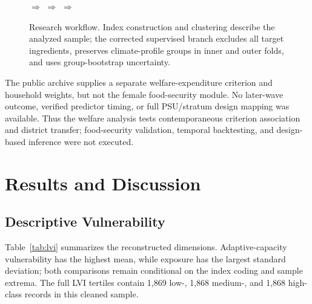 \documentclass[conference,a4paper]{IEEEtran}
\begin{document}
\begin{figure}[t]
\centering
\setlength{\fboxsep}{4pt}
\footnotesize
{}
\hfill$\Longrightarrow$\hfill
{}
\hfill$\Longrightarrow$\hfill
{}
\hfill$\Longrightarrow$\hfill
{}
\caption{Research workflow. Index construction and clustering describe the analyzed sample; the corrected supervised branch excludes all target ingredients, preserves climate-profile groups in inner and outer folds, and uses group-bootstrap uncertainty.}
\label{fig:workflow}
\end{figure}

The public archive supplies a separate welfare-expenditure criterion and household weights, but not the female food-security module. No later-wave outcome, verified predictor timing, or full PSU/stratum design mapping was available. Thus the welfare analysis tests contemporaneous criterion association and district transfer; food-security validation, temporal backtesting, and design-based inference were not executed.

\section{Results and Discussion}
\subsection{Descriptive Vulnerability}
Table~\ref{tab:lvi} summarizes the reconstructed dimensions. Adaptive-capacity vulnerability has the highest mean, while exposure has the largest standard deviation; both comparisons remain conditional on the index coding and sample extrema. The full LVI tertiles contain 1,869 low-, 1,868 medium-, and 1,868 high-class records in this cleaned sample.
\end{document}
